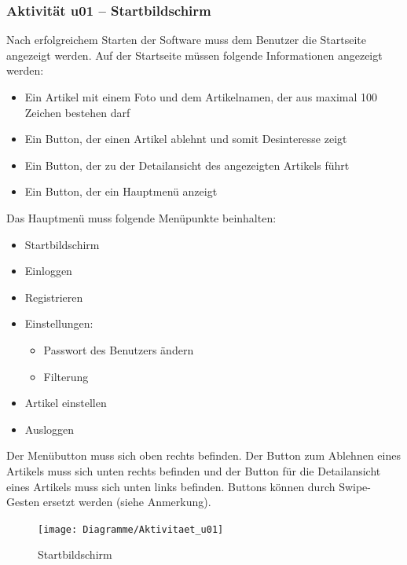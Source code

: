 \documentclass[a4paper,12pt,oneside]{scrartcl}
\begin{document}
\hypertarget{u01}{\subsubsection{Aktivität u01 – Startbildschirm}}
Nach erfolgreichem Starten der Software muss dem Benutzer die Startseite angezeigt werden. Auf der Startseite müssen folgende Informationen angezeigt werden:
\begin{itemize}
	\item Ein Artikel mit einem Foto und dem Artikelnamen, der aus maximal 100 Zeichen bestehen darf
	\item Ein Button, der einen Artikel ablehnt und somit Desinteresse zeigt
	\item Ein Button, der zu der Detailansicht des angezeigten Artikels führt
	\item Ein Button, der ein Hauptmenü anzeigt
\end{itemize}
Das Hauptmenü muss folgende Menüpunkte beinhalten:
\begin{itemize}
	\item Startbildschirm
	\item Einloggen
	\item Registrieren
	\item Einstellungen:
	\begin{itemize}
		\item Passwort des Benutzers ändern
		\item Filterung
	\end{itemize}
	\item Artikel einstellen
	\item Ausloggen
\end{itemize}

Der Menübutton muss sich oben rechts befinden. Der Button zum Ablehnen eines Artikels muss sich unten rechts befinden und der Button für die Detailansicht eines Artikels muss sich unten links befinden. Buttons können durch Swipe-Gesten ersetzt werden (siehe Anmerkung).

\begin{figure}[!htbp]
\centering
\noindent\texttt{[image: Diagramme/Aktivitaet\_u01]}
\caption{Startbildschirm}
\end{figure}
\FloatBarrier
\end{document}
